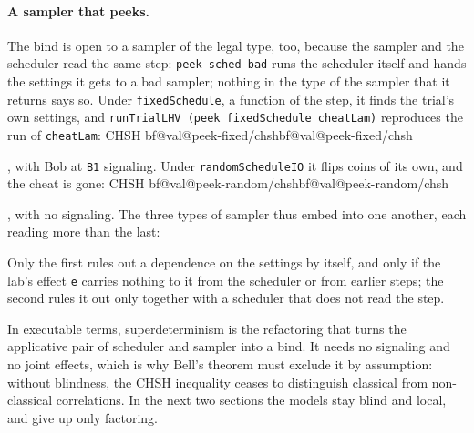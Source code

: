 \documentclass[11pt]{article}
\makeatletter
\newcommand{\hs}{\lstinline[style=hask,basicstyle=\ttfamily,frame=none]}
\newcommand{\val}[1]{\ifcsname bf@val@#1\endcsname\csname bf@val@#1\endcsname
  \else\PackageError{paper}{No value #1 in generated/values.tex}{}\fi}
\makeatother
\begin{document}
\paragraph{A sampler that peeks.} The bind is open to a sampler of the legal type, too, because the sampler and the scheduler read the same step:
\noindent \hs|peek sched bad| runs the scheduler itself and hands the settings it gets to a bad sampler; nothing in the type of the sampler that it returns says so. Under \hs|fixedSchedule|, a function of the step, it finds the trial's own settings, and \hs|runTrialLHV (peek fixedSchedule cheatLam)| reproduces the run of \hs|cheatLam|: CHSH \val{peek-fixed/chsh}, with Bob at \hs|B1| signaling. Under \hs|randomScheduleIO| it flips coins of its own, and the cheat is gone: CHSH \val{peek-random/chsh}, with no signaling. The three types of sampler thus embed into one another, each reading more than the last:
\begin{center}
\end{center}
Only the first rules out a dependence on the settings by itself, and only if the lab's effect \hs|e| carries nothing to it from the scheduler or from earlier steps; the second rules it out only together with a scheduler that does not read the step.

In executable terms, superdeterminism is the refactoring that turns the applicative pair of scheduler and sampler into a bind. It needs no signaling and no joint effects, which is why Bell's theorem must exclude it by assumption: without blindness, the CHSH inequality ceases to distinguish classical from non-classical correlations. In the next two sections the models stay blind and local, and give up only factoring.
\end{document}
